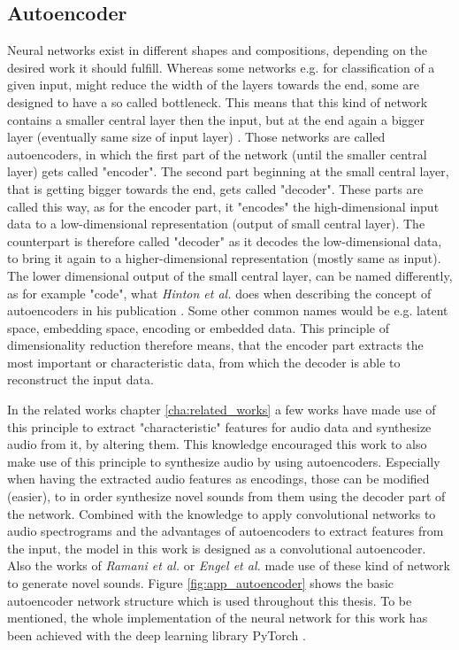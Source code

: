 \subsection{Autoencoder}
Neural networks exist in different shapes and compositions, depending on the desired work it should fulfill. Whereas some networks e.g. for classification of a given input, might reduce the width of the layers towards the end, some are designed to have a so called bottleneck. This means that this kind of network contains a smaller central layer then the input, but at the end again a bigger layer (eventually same size of input layer) \cite{hinton2006autoencoder}. Those networks are called autoencoders, in which the first part of the network (until the smaller central layer) gets called "encoder". The second part beginning at the small central layer, that is getting bigger towards the end, gets called "decoder". These parts are called this way, as for the encoder part, it "encodes" the high-dimensional input data to a low-dimensional representation (output of small central layer). The counterpart is therefore called "decoder" as it decodes the low-dimensional data, to bring it again to a higher-dimensional representation (mostly same as input). The lower dimensional output of the small central layer, can be named differently, as for example "code", what \textit{Hinton et al.} does when describing the concept of autoencoders in his publication \cite{hinton2006autoencoder}. Some other common names would be e.g. latent space, embedding space, encoding or embedded data. This principle of dimensionality reduction therefore means, that the encoder part extracts the most important or characteristic data, from which the decoder is able to reconstruct the input data.

In the related works chapter \ref{cha:related_works} a few works have made use of this principle to extract "characteristic" features for audio data and synthesize audio from it, by altering them. This knowledge encouraged this work to also make use of this principle to synthesize audio by using autoencoders. Especially when having the extracted audio features as encodings, those can be modified (easier), to in order synthesize novel sounds from them using the decoder part of the network. 
Combined with the knowledge to apply convolutional networks to audio spectrograms and the advantages of autoencoders to extract features from the input, the model in this work is designed as a convolutional autoencoder. Also the works of \textit{Ramani et al.} or \textit{Engel et al.} made use of these kind of network to generate novel sounds. Figure \ref{fig:app_autoencoder} shows the basic autoencoder network structure which is used throughout this thesis. To be mentioned, the whole implementation of the neural network for this work has been achieved with the deep learning library PyTorch \cite{paszke2019pytorch}.


